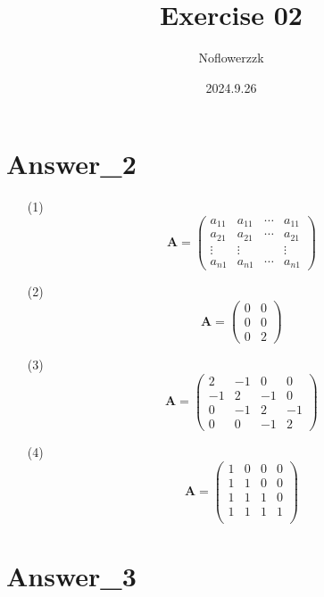 \documentclass{article}
\title{Exercise 02}
\author{Noflowerzzk}
\date{2024.9.26}
\begin{document}
\maketitle

\section{Answer\_2}


\begin{itemize}
    \item [(1)] \[
        \boldsymbol{A} = 
        \begin{pmatrix}
            a_{11} & a_{11} & \cdots & a_{11} \\
            a_{21} & a_{21} & \cdots & a_{21} \\
            \vdots & \vdots &        & \vdots \\
            a_{n1} & a_{n1} & \cdots & a_{n1}
        \end{pmatrix}
    \]

    \item [(2)] \[
        \boldsymbol{A} = 
        \begin{pmatrix}
            0 & 0 \\
            0 & 0 \\
            0 & 2
        \end{pmatrix}
    \]
    \item[(3)] \[
        \boldsymbol{A}=
        \begin{pmatrix}
            2 & -1 & 0 & 0 \\
            -1 & 2 & -1 & 0 \\
            0 & -1 & 2 & -1 \\
            0 & 0 & -1 & 2
        \end{pmatrix}
    \]
    \item[(4)] \[
        \boldsymbol{A}=
        \begin{pmatrix}
            1 & 0 & 0 & 0 \\            
            1 & 1 & 0 & 0 \\
            1 & 1 & 1 & 0 \\
            1 & 1 & 1 & 1 \\
        \end{pmatrix}
    \]
\end{itemize}

\section{Answer\_3}
\end{document}
